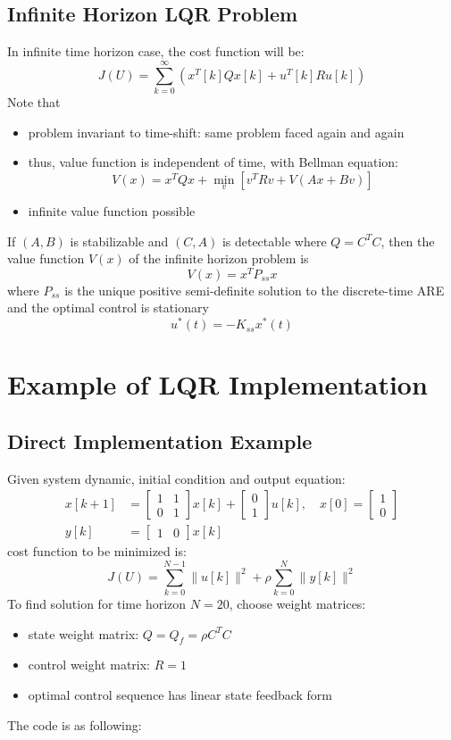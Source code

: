 \documentclass[10pt,a4paper,oneside]{article}
\begin{document}
\subsection{Infinite Horizon LQR Problem}

In infinite time horizon case, the cost function will be:
\[
J(U)=\sum_{k=0}^{\infty}\left(x^{T}[k] Q x[k]+u^{T}[k] R u[k]\right)
\]
Note that
\begin{itemize}
	\item problem invariant to time-shift: same problem faced again and again
	\item thus, value function is independent of time, with Bellman equation:
	\[
	V(x)=x^{T} Q x+\min _{v}\left[v^{T} R v+V(A x+B v)\right]
	\]
	\item infinite value function possible
\end{itemize}
If $(A,B)$ is stabilizable and $(C,A)$ is detectable where $Q=C^TC$, then the value function $V(x)$ of the infinite horizon problem is 
\[
V(x)=x^TP_{ss}x
\]
where $P_{ss}$ is the unique positive semi-definite solution to the discrete-time ARE and the optimal control is stationary 
\[
u^*(t)=-K_{ss}x^*(t)
\]


\section{Example of LQR Implementation}

\subsection{Direct Implementation Example}
Given system dynamic, initial condition and output equation:
\begin{align*}
	x[k+1] &=\left[\begin{array}{ll}{1} & {1} \\ 
	{0} & {1}\end{array}\right] 
	x[k]+
	\left[\begin{array}{l}{0} \\ {1}\end{array}\right] 
	u[k], \quad x[0]=\left[\begin{array}{l}{1} \\ {0}\end{array}\right]\\
	y[k]&=\left[\begin{array}{ll}{1} & {0}\end{array}\right] x[k]
\end{align*}
cost function to be minimized is:
\[
J(U)=\sum_{k=0}^{N-1}\|u[k]\|^{2}+\rho \sum_{k=0}^{N}\|y[k]\|^{2}
\]
To find solution for time horizon $N=20$, choose weight matrices:
\begin{itemize}
	\item state weight matrix: $Q = Q_f = \rho C^T C$
	\item control weight matrix: $R=1$
	\item optimal control sequence has linear state feedback form
\end{itemize}
The code is as following:
\end{document}
